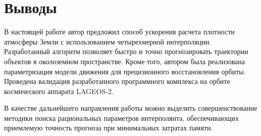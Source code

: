 \section{Выводы}
\label{sec:Chapter5} 
В настоящей работе автор предложил способ ускорения расчета плотности атмосферы Земли с 
использованием четырехмерной интерполяции. Разработанный алгоритм позволяет
быстро и точно прогнозировать траектории объектов в околоземном пространстве. 
Кроме того, автором была реализована параметризация модели движения для прецизионного
восстановления орбиты. Проведена валидация разработанного программного комплекса на 
орбите космического аппарата LAGEOS-2.

В качестве дальнейшего направления работы можно выделить совершенствование методики
поиска рациональных параметров интерполянта, обеспечивающих приемлемую точность прогноза
при минимальных затратах памяти.
\newpage